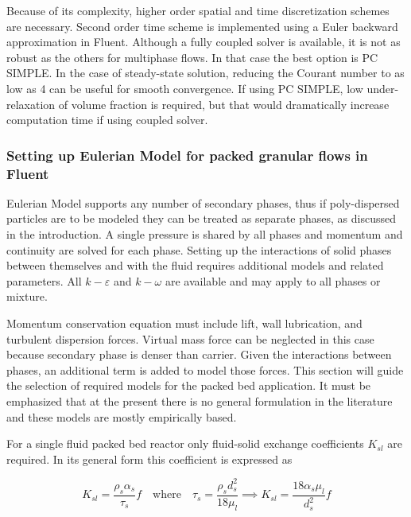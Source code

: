 Because of its complexity, higher order spatial and time discretization schemes are necessary. Second order time scheme is implemented using a Euler backward approximation in Fluent. Although a fully coupled solver is available, it is not as robust as the others for multiphase flows. In that case the best option is PC SIMPLE. In the case of steady-state solution, reducing the Courant number to as low as 4 can be useful for smooth convergence. If using PC SIMPLE, low under-relaxation of volume fraction is required, but that would dramatically increase computation time if using coupled solver.

\subsubsection{Setting up Eulerian Model for packed granular flows in Fluent}

Eulerian Model supports any number of secondary phases, thus if poly-dispersed particles are to be modeled they can be treated as separate phases, as discussed in the introduction. A single pressure is shared by all phases and momentum and continuity are solved for each phase. Setting up the interactions of solid phases between themselves and with the fluid requires additional models and related parameters. All $k-\varepsilon$ and $k-\omega$ are available and may apply to all phases or mixture.

Momentum conservation equation must include lift, wall lubrication, and turbulent dispersion forces. Virtual mass force can be neglected in this case because secondary phase is denser than carrier. Given the interactions between phases, an additional term is added to model those forces. This section will guide the selection of required models for the packed bed application. It must be emphasized that at the present there is no general formulation in the literature and these models are mostly empirically based.

For a single fluid packed bed reactor only fluid-solid exchange coefficients $K_{sl}$ are required. In its general form this coefficient is expressed as

\begin{equation}
K_{sl}=\frac{\rho_{s}\alpha_{s}}{\tau_{s}}f\quad\text{where}\quad\tau_{s}=\frac{\rho_{s}d_{s}^{2}}{18\mu_{l}}\implies{}K_{sl}=\frac{18\alpha_{s}\mu_{l}}{d_{s}^{2}}f
\end{equation}

